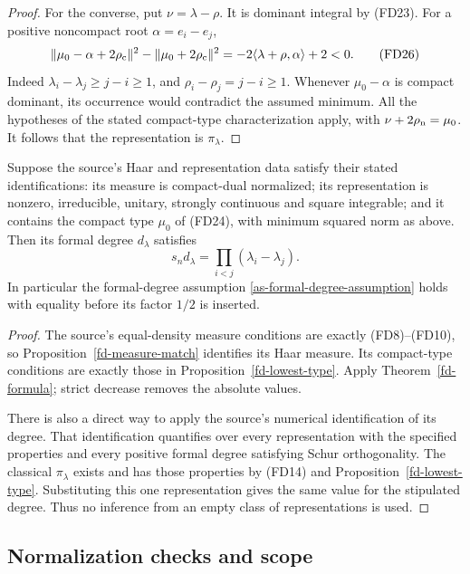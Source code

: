 \begin{proof}
For the converse, put $\nu=\lambda-\rho$. It is dominant
integral by (FD23). For a positive noncompact root
$\alpha=e_i-e_j$,
\[
 \|\mu_0-\alpha+2\rho_{\rm c}\|^2
       -\|\mu_0+2\rho_{\rm c}\|^2
       =-2\langle\lambda+\rho,\alpha\rangle+2<0.
 \tag{FD26}
\]
Indeed $\lambda_i-\lambda_j\ge j-i\ge1$, and
$\rho_i-\rho_j=j-i\ge1$.
Whenever $\mu_0-\alpha$ is compact dominant, its occurrence
would contradict the assumed minimum. All the hypotheses
of the stated compact-type characterization apply, with
$\nu+2\rho_{\rm n}=\mu_0$. It follows that the representation
is $\pi_\lambda$.
\end{proof}

\begin{corollary}\label{fd-source}
Suppose the source's Haar and representation data satisfy
their stated identifications: its measure is compact-dual
normalized; its representation is nonzero, irreducible,
unitary, strongly continuous and square integrable; and
it contains the compact type $\mu_0$ of (FD24), with
minimum squared norm as above. Then its formal degree
$d_\lambda$ satisfies
\[
                  s_n d_\lambda
                      =\prod_{i<j}(\lambda_i-\lambda_j).
 \tag{FD27}
\]
In particular the formal-degree assumption
\eqref{as-formal-degree-assumption} holds with equality
before its factor $1/2$ is inserted.
\end{corollary}
\begin{proof}
The source's equal-density measure conditions are exactly
(FD8)--(FD10), so Proposition~\ref{fd-measure-match}
identifies its Haar measure. Its compact-type conditions
are exactly those in Proposition~\ref{fd-lowest-type}.
Apply Theorem~\ref{fd-formula}; strict decrease removes
the absolute values.

There is also a direct way to apply the source's numerical
identification of its degree. That identification quantifies
over every representation with the specified properties
and every positive formal degree satisfying Schur
orthogonality. The classical $\pi_\lambda$ exists and
has those properties by (FD14) and
Proposition~\ref{fd-lowest-type}. Substituting this one
representation gives the same value for the stipulated
degree. Thus no inference from an empty class of
representations is used.
\end{proof}

\subsection{Normalization checks and scope}

